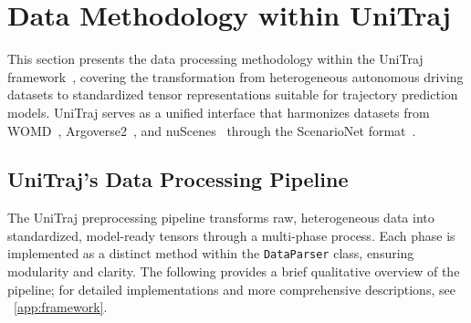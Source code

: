 \section{Data Methodology within UniTraj}
\label{sec:data_methodology}

This section presents the data processing methodology within the UniTraj framework~\cite{unitrajFeng2024}, covering the transformation from heterogeneous autonomous driving datasets to standardized tensor representations suitable for trajectory prediction models. UniTraj serves as a unified interface that harmonizes datasets from WOMD~\cite{WOMD2021}, Argoverse2~\cite{av2Wilson2023}, and nuScenes~\cite{caesar2020nuscenes} through the ScenarioNet format~\cite{scenarionetLi2023}.

\subsection{UniTraj's Data Processing Pipeline}
\label{ssec:data_pipeline}

The UniTraj preprocessing pipeline transforms raw, heterogeneous data into standardized, model-ready tensors through a multi-phase process. Each phase is implemented as a distinct method within the \texttt{DataParser} class, ensuring modularity and clarity. The following provides a brief qualitative overview of the pipeline; for detailed implementations and more comprehensive descriptions, see ~\autoref{app:framework}.

